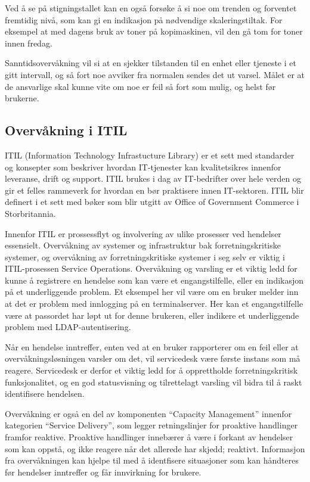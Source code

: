 Ved å se på stigningstallet kan en også forsøke å si noe om trenden og forventet fremtidig nivå, som kan gi en indikasjon på nødvendige skaleringstiltak. For eksempel at med dagens bruk av toner på kopimaskinen, vil den gå tom for toner innen fredag. 

Sanntidsovervåkning vil si at en sjekker tilstanden til en enhet eller tjeneste i et gitt intervall, og så fort noe avviker fra normalen sendes det ut varsel. Målet er at de ansvarlige skal kunne vite om noe er feil så fort som mulig, og helst før brukerne.

\subsection{Overvåkning i ITIL}
ITIL (Information Technology Infrastucture Library) er et sett med standarder og konsepter som beskriver hvordan IT-tjenester kan kvalitetsikres innenfor leveranse, drift og support. ITIL brukes i dag av IT-bedrifter over hele verden og gir et felles rammeverk for hvordan en bør praktisere innen IT-sektoren. ITIL blir definert i et sett med bøker som blir utgitt av Office of Government Commerce i Storbritannia.

Innenfor ITIL er prossessflyt og involvering av ulike prosesser ved hendelser essensielt. Overvåkning av systemer og infrastruktur bak forretningskritiske systemer, og overvåkning av forretningskritiske systemer i seg selv er viktig i ITIL-prosessen Service Operations. Overvåkning og varsling er et viktig ledd for kunne å registrere en hendelse som kan være et engangstilfelle, eller en indikasjon på et underliggende problem. Et eksempel her vil være om en bruker melder inn at det er problem med innlogging på en terminalserver. Her kan et engangstilfelle være at passordet har løpt ut for denne brukeren, eller indikere et underliggende problem med LDAP-autentisering.

Når en hendelse inntreffer, enten ved at en bruker rapporterer om en feil eller at overvåkningsløsningen varsler om det, vil servicedesk være første instans som må reagere. Servicedesk er derfor et viktig ledd for å opprettholde forretningskritisk funksjonalitet, og en god statusvisning og tilrettelagt varsling vil bidra til å raskt identifisere hendelsen.

Overvåkning er også en del av komponenten ``Capacity Management'' innenfor kategorien ``Service Delivery'', som legger retningslinjer for proaktive handlinger framfor reaktive. Proaktive handlinger innebærer å være i forkant av hendelser som kan oppstå, og ikke reagere når det allerede har skjedd; reaktivt. Informasjon fra overvåkningen kan hjelpe til med å identfisere situasjoner som kan håndteres før hendelser inntreffer og får innvirkning for brukere. \cite{itil1,itil2,events}


